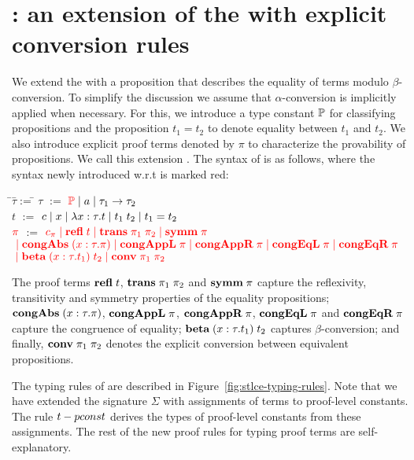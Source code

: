 \documentclass[10pt]{article}
\begin{document}
\section{\STLCE: an extension of the \STLC with explicit conversion rules}
%
We extend the \STLC with a proposition that describes the equality of
terms modulo $\beta$-conversion. To simplify the discussion we assume
that $\alpha$-conversion is implicitly applied when necessary. For
this, we introduce a type constant $\mathbb{P}$ for classifying
propositions and the proposition $t_1 = t_2$ to denote equality
between $t_1$ and $t_2$. We also introduce explicit proof terms
denoted by $\pi$ to characterize the provability of propositions. We
call this extension \STLCE. The syntax of \STLCE is as follows, where the
syntax newly introduced w.r.t \STLC is marked red:
%
\begin{tabbing}
\qquad\=$\tau$\quad\=$:=$\quad\=\kill
\>$\tau$  \>$:=$  \>$\textcolor{red}{\mathbb{P}} \; | \; a \; | \; \tau_1 \to \tau_2$\\
\>$t$     \>$:=$  \>$c \; | \; x \; | \; \lambda{x}:{\tau}.{t} \; | \; t_1\; t_2 \; | \; t_1 = t_2$\\
\>$\textcolor{red}{\pi}$   \>$:=$  \>$\textcolor{red}{c_\pi \; | \; \mbox{\bf refl}\; t \; | \; \mbox{\bf trans}\;\pi_1\; \pi_2 \; | \; \mbox{\bf symm}\; \pi}$\\
\>\>\>$\textcolor{red}{\; | \; \mbox{\bf congAbs}\;(x:\tau.\pi) \; | \; \mbox{\bf congAppL}\;\pi \; | \; \mbox{\bf congAppR}\;\pi 
       \; | \; \mbox{\bf congEqL}\;\pi \; | \; \mbox{\bf congEqR}\;\pi}$\\
\>\>\>$\textcolor{red}{\; | \; \mbox{\bf beta}\;(x:\tau.t_1)\; t_2 \; | \; \mbox{\bf conv}\; \pi_1\; \pi_2}$
\end{tabbing}
%
The proof terms $\mbox{\bf refl}\; t$, $\mbox{\bf trans}\;\pi_1\; \pi_2$ and $\mbox{\bf symm}\; \pi$
capture the reflexivity, transitivity and symmetry properties of the
equality propositions; $\mbox{\bf congAbs}\;(x:\tau.\pi)$, $\mbox{\bf congAppL}\;\pi$,
$\mbox{\bf congAppR}\;\pi$, $\mbox{\bf congEqL}\;\pi$ and $\mbox{\bf congEqR}\;\pi$ capture the
congruence of equality; $\mbox{\bf beta}\;(x:\tau.t_1)\; t_2$ captures
$\beta$-conversion; and finally, $\mbox{\bf conv}\; \pi_1\; \pi_2$ denotes the
explicit conversion between equivalent propositions.

The typing rules of \STLCE are described in Figure~\ref{fig:stlce-typing-rules}.
Note that we have extended the signature $\Sigma$ with assignments of
terms to proof-level constants. The rule $t-pconst$ derives the
types of proof-level constants from these assignments. The rest of the new
proof rules for typing proof terms are self-explanatory.
\end{document}

